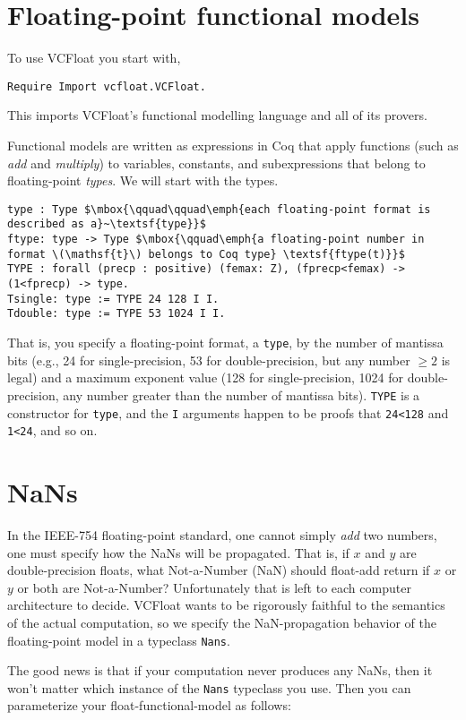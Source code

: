 \documentclass[article]{memoir}
\begin{document}
\chapter{Floating-point functional models}
To use VCFloat you start with,
\begin{lstlisting}
Require Import vcfloat.VCFloat.
\end{lstlisting}
This imports VCFloat's functional modelling language and all of its
provers.  

Functional models are written as expressions in Coq that apply
functions (such as \emph{add} and \emph{multiply}) to
variables, constants, and subexpressions that belong to floating-point
\emph{types}.  We will start with the types.

\begin{lstlisting}
type : Type $\mbox{\qquad\qquad\emph{each floating-point format is described as a}~\textsf{type}}$
ftype: type -> Type $\mbox{\qquad\emph{a floating-point number in format \(\mathsf{t}\) belongs to Coq type} \textsf{ftype(t)}}$
TYPE : forall (precp : positive) (femax: Z), (fprecp<femax) -> (1<fprecp) -> type.
Tsingle: type := TYPE 24 128 I I.
Tdouble: type := TYPE 53 1024 I I.
\end{lstlisting}

That is, you specify a floating-point format, a \lstinline{type}, by
the number of mantissa bits (e.g., 24 for single-precision, 53 for
double-precision, but any number $\ge 2$ is legal) and a maximum
exponent value (128 for single-precision, 1024 for double-precision,
any number greater than the number of mantissa bits).
\lstinline{TYPE} is a constructor for \lstinline{type}, and the
\lstinline{I} arguments happen to be proofs that \lstinline{24<128}
and \lstinline{1<24}, and so on.

\chapter{NaNs}
In the IEEE-754 floating-point standard, one cannot
simply \emph{add} two numbers, one must specify how the NaNs will
be propagated.  That is, if $x$ and $y$ are double-precision floats,
what Not-a-Number (NaN) should float-add return if $x$ or $y$ or both are
Not-a-Number?  Unfortunately that is left to each computer architecture 
to decide.  VCFloat wants to be rigorously faithful to the
semantics of the actual computation, so we specify the
NaN-propagation behavior of the floating-point model in a
typeclass \lstinline{Nans}.

The good news is that if your computation never produces any
NaNs, then it won't matter which instance of the \lstinline{Nans}
typeclass you use.
Then you can parameterize your float-functional-model as follows:
\end{document}
